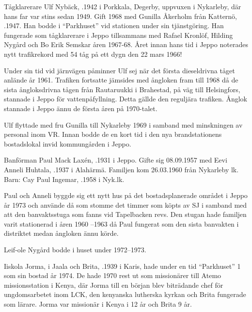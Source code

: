 
Tågklarerare Ulf Nybäck, .1942 i Porkkala, Degerby, uppvuxen i Nykarleby, där hans far var stins sedan 1949. Gift 1968 med Gunilla Åkerholm från Katternö, .1947. Han bodde i ``Parkhuset'' vid stationen under sin tjänstgöring. Han fungerade som tågklarerare i Jeppo tillsammans med Rafael Kronlöf, Hilding Nygård och Bo Erik Semskar åren 1967-68. Året innan hans tid i Jeppo noterades nytt trafikrekord med 54 tåg på ett dygn den 22 mars 1966!

Under sin tid vid järnvägen påminner Ulf sej när det första dieseldrivna tåget anlände år 1961. Trafiken fortsatte jämsides med ångloken fram till 1968 då de sista ångloksdrivna tågen från Rautaruukki i Brahestad, på väg till Helsingfors, stannade i Jeppo för vattenpåfyllning. Detta gällde den reguljära trafiken. Ånglok stannade i Jeppo ännu de första åren på 1970-talet.

Ulf flyttade med fru Gunilla till Nykarleby 1969 i samband med minskningen av personal inom VR. Innan bodde de en kort tid i den nya brandstationens bostadslokal invid kommungården i Jeppo.


Banförman Paul Mack Laxén, .1931 i Jeppo. Gifte sig 08.09.1957 med Eevi Anneli Huhtala, .1937 i Alahärmä.  Familjen kom 26.03.1960 från Nykarleby lk.
Barn: Cay Paul Ingemar, .1958 i Nyk.lk.

Paul och Anneli byggde sig ett nytt hus på det bostadsplanerade området i Jeppo år 1973  och använde då som stomme det timmer som köpts av SJ i samband med att den banvaktsstuga som fanns vid Tapelbacken revs. Den stugan hade familjen varit stationerad i åren 1960 –1963 då Paul fungerat som den sista banvakten i distriktet medan ångloken ännu körde.

Leif-ole Nygård bodde i huset under 1972--1973.

Iiskola Jorma,  i Jaala och Brita, .1939 i Karis, hade under en tid ``Parkhuset'' 1 som sin bostad år 1974. De hade 1970 rest ut som missionärer till Atemo missionsstation i Kenya, där Jorma till en början blev biträdande chef för ungdomsarbetet inom LCK, den kenyanska lutherska kyrkan och Brita fungerade som lärare. Jorma var missionär i Kenya i 12 år och Brita 9 år.








